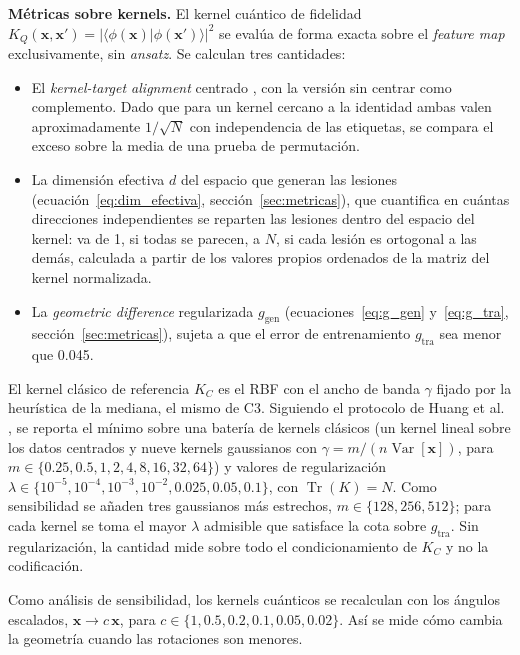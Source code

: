 \textbf{Métricas sobre kernels.} El kernel cuántico de fidelidad
$K_Q(\mathbf{x},\mathbf{x}') = |\langle\phi(\mathbf{x})|\phi(\mathbf{x}')\rangle|^2$ se
evalúa de forma exacta sobre el \textit{feature map} exclusivamente, sin \textit{ansatz}.
Se calculan tres cantidades:
\begin{itemize}
  \item El \textit{kernel-target alignment} centrado \cite{Cortes2012}, con la versión sin
        centrar \cite{cristianini2002kernel} como complemento. Dado que para un kernel cercano a la
        identidad ambas valen aproximadamente $1/\sqrt{N}$ con independencia de las
        etiquetas, se compara el exceso sobre la media de una prueba de permutación.
  \item La dimensión efectiva $d$ del espacio que generan las lesiones \cite{huang2021power}
        (ecuación~\eqref{eq:dim_efectiva}, sección~\ref{sec:metricas}), que cuantifica en cuántas
        direcciones independientes se reparten las lesiones dentro del espacio del kernel: va de
        1, si todas se parecen, a $N$, si cada lesión es ortogonal a las demás, calculada a partir
        de los valores propios ordenados de la matriz del kernel normalizada.
  \item La \textit{geometric difference} regularizada $g_{\mathrm{gen}}$ \cite{huang2021power}
        (ecuaciones~\eqref{eq:g_gen} y~\eqref{eq:g_tra}, sección~\ref{sec:metricas}), sujeta a que
        el error de entrenamiento $g_{\mathrm{tra}}$ sea menor que 0.045.
\end{itemize}

El kernel clásico de referencia $K_C$ es el RBF con el ancho de banda $\gamma$ fijado por la
heurística de la mediana, el mismo de C3. Siguiendo el protocolo de Huang et al. \cite{huang2021power},
se reporta el mínimo sobre una batería de kernels clásicos (un kernel lineal sobre los datos
centrados y nueve kernels gaussianos con $\gamma = m/(n\operatorname{Var}[\mathbf{x}])$, para
$m\in\{0.25,0.5,1,2,4,8,16,32,64\}$) y valores de regularización
$\lambda\in\{10^{-5},10^{-4},10^{-3},10^{-2},0.025,0.05,0.1\}$, con $\operatorname{Tr}(K) = N$. Como
sensibilidad se añaden tres gaussianos más estrechos, $m\in\{128,256,512\}$;
para cada kernel se toma el mayor $\lambda$ admisible que satisface la cota sobre $g_{\mathrm{tra}}$.
Sin regularización, la cantidad mide sobre todo el condicionamiento de $K_C$ y no la codificación.

Como análisis de sensibilidad, los kernels cuánticos se recalculan con los ángulos escalados,
$\mathbf{x}\to c\,\mathbf{x}$, para $c \in \{1, 0.5, 0.2, 0.1, 0.05, 0.02\}$. Así se mide cómo cambia la
geometría cuando las rotaciones son menores.

